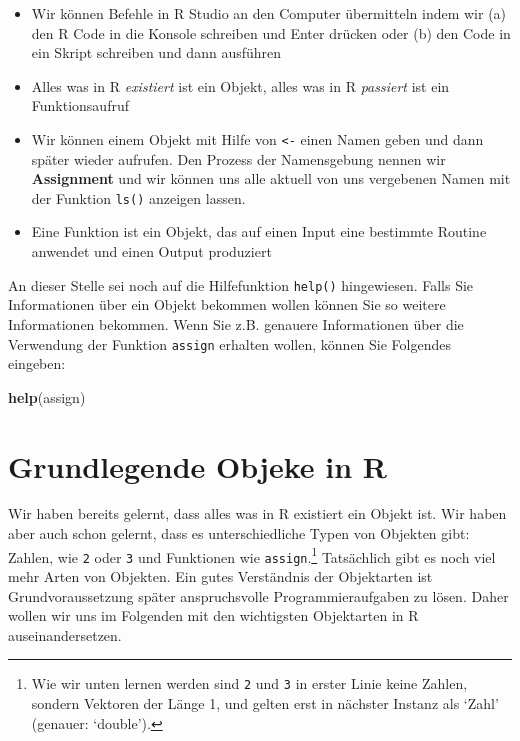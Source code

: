 \documentclass[]{book}
\newenvironment{Shaded}{\begin{snugshade}}{\end{snugshade}}
\newcommand{\KeywordTok}[1]{\textcolor[rgb]{0.13,0.29,0.53}{\textbf{#1}}}
\newcommand{\NormalTok}[1]{#1}
\providecommand{\tightlist}{%
  \setlength{\itemsep}{0pt}\setlength{\parskip}{0pt}}
\let\rmarkdownfootnote\footnote%
\def\footnote{\protect\rmarkdownfootnote}
\begin{document}
\begin{itemize}
\tightlist
\item
  Wir können Befehle in R Studio an den Computer übermitteln indem wir
  (a) den R Code in die Konsole schreiben und Enter drücken oder (b) den
  Code in ein Skript schreiben und dann ausführen
\item
  Alles was in R \emph{existiert} ist ein Objekt, alles was in R
  \emph{passiert} ist ein Funktionsaufruf
\item
  Wir können einem Objekt mit Hilfe von \texttt{\textless{}-} einen
  Namen geben und dann später wieder aufrufen. Den Prozess der
  Namensgebung nennen wir \textbf{Assignment} und wir können uns alle
  aktuell von uns vergebenen Namen mit der Funktion \texttt{ls()}
  anzeigen lassen.
\item
  Eine Funktion ist ein Objekt, das auf einen Input eine bestimmte
  Routine anwendet und einen Output produziert
\end{itemize}

An dieser Stelle sei noch auf die Hilfefunktion \texttt{help()}
hingewiesen. Falls Sie Informationen über ein Objekt bekommen wollen
können Sie so weitere Informationen bekommen. Wenn Sie z.B. genauere
Informationen über die Verwendung der Funktion \texttt{assign} erhalten
wollen, können Sie Folgendes eingeben:

\begin{Shaded}
\begin{Highlighting}[]
\KeywordTok{help}\NormalTok{(assign)}
\end{Highlighting}
\end{Shaded}

\section{Grundlegende Objeke in R}\label{grundlegende-objeke-in-r}

Wir haben bereits gelernt, dass alles was in R existiert ein Objekt ist.
Wir haben aber auch schon gelernt, dass es unterschiedliche Typen von
Objekten gibt: Zahlen, wie \texttt{2} oder \texttt{3} und Funktionen wie
\texttt{assign}.\footnote{Wie wir unten lernen werden sind \texttt{2}
  und \texttt{3} in erster Linie keine Zahlen, sondern Vektoren der
  Länge 1, und gelten erst in nächster Instanz als `Zahl' (genauer:
  `double').} Tatsächlich gibt es noch viel mehr Arten von Objekten. Ein
gutes Verständnis der Objektarten ist Grundvoraussetzung später
anspruchsvolle Programmieraufgaben zu lösen. Daher wollen wir uns im
Folgenden mit den wichtigsten Objektarten in R auseinandersetzen.
\end{document}
